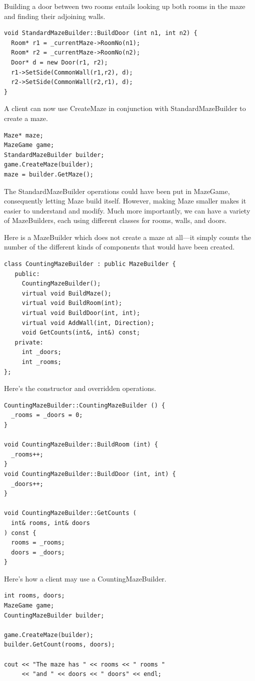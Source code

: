 \documentclass[11pt]{report}
\begin{document}
Building a door between two rooms entails looking up both rooms 
in the maze and finding their adjoining walls.
\begin{lstlisting}
void StandardMazeBuilder::BuildDoor (int n1, int n2) {
  Room* r1 = _currentMaze->RoomNo(n1);
  Room* r2 = _currentMaze->RoomNo(n2);
  Door* d = new Door(r1, r2);
  r1->SetSide(CommonWall(r1,r2), d);
  r2->SetSide(CommonWall(r2,r1), d);
}
\end{lstlisting}

A client can now use CreateMaze in conjunction with StandardMazeBuilder to create a maze.
\begin{lstlisting}
Maze* maze;
MazeGame game;
StandardMazeBuilder builder;
game.CreateMaze(builder);
maze = builder.GetMaze();
\end{lstlisting}

The StandardMazeBuilder operations could have been put in MazeGame, consequently 
letting Maze build itself. However, making Maze smaller makes it easier to understand
and modify. Much more importantly, we can have a variety of MazeBuilders, each
using different classes for rooms, walls, and doors.

Here is a MazeBuilder which does not create a maze at all---it simply counts the number
of the different kinds of components that would have been created.
\begin{lstlisting}
class CountingMazeBuilder : public MazeBuilder {
   public:
     CountingMazeBuilder();
     virtual void BuildMaze();
     virtual void BuildRoom(int);
     virtual void BuildDoor(int, int);
     virtual void AddWall(int, Direction);
     void GetCounts(int&, int&) const;
   private:
     int _doors;
     int _rooms;
};
\end{lstlisting}

Here's the constructor and overridden operations.
\begin{lstlisting}
CountingMazeBuilder::CountingMazeBuilder () {
  _rooms = _doors = 0;
}

void CountingMazeBuilder::BuildRoom (int) {
  _rooms++;
}
void CountingMazeBuilder::BuildDoor (int, int) {
  _doors++;
}

void CountingMazeBuilder::GetCounts (
  int& rooms, int& doors
) const {
  rooms = _rooms;
  doors = _doors;
}
\end{lstlisting}

Here's how a client may use a CountingMazeBuilder.
\begin{lstlisting}
int rooms, doors;
MazeGame game;
CountingMazeBuilder builder;

game.CreateMaze(builder);
builder.GetCount(rooms, doors);

cout << "The maze has " << rooms << " rooms "
     << "and " << doors << " doors" << endl;
\end{lstlisting}
\end{document}
